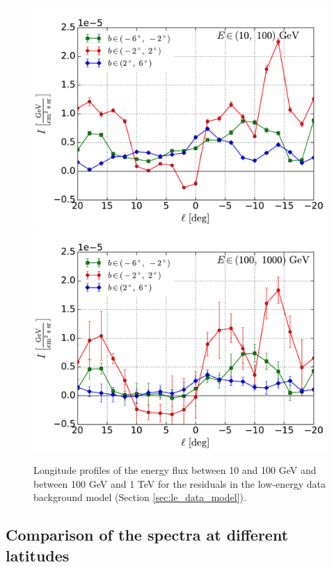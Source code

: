 \begin{figure}[h]
\centering
\includegraphics[width=\twopic\textwidth]{plots/Lon_profiles_LowE_source_range_1.pdf}
\includegraphics[width=\twopic\textwidth]{plots/Lon_profiles_LowE_source_range_2.pdf}
  	\caption{Longitude profiles of the energy flux between 10 and 100 GeV and between 100 GeV and 1 TeV 
	for the residuals in the low-energy data background model (Section \ref{sec:le_data_model}).}
  	\label{fig:lon-profiles}
\end{figure}


\subsection{Comparison of the spectra at different latitudes}

